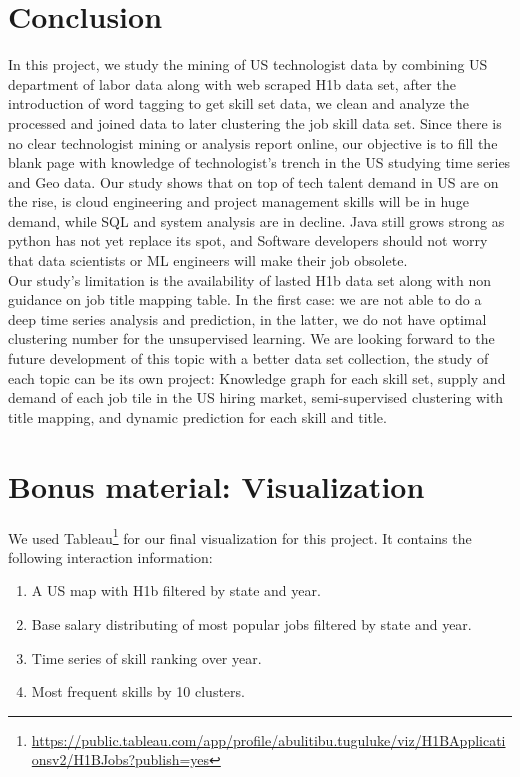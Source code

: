 \section{Conclusion}
In this project, we study the mining of US technologist data by combining US department of labor data along with web scraped H1b data set, after the introduction of word tagging to get skill set data, we clean and analyze the processed and joined data to later clustering the job skill data set. Since there is no clear technologist mining or analysis report online, our objective is to fill the blank page with knowledge of technologist's trench in the US studying  time series and Geo data. Our study shows that on top of tech talent demand in US are on the rise, is cloud engineering and project management skills will be in huge demand, while SQL and system analysis are in decline. Java still grows strong as python has not yet replace its spot, and Software developers should not worry that data scientists or ML engineers will make their job obsolete. \\
Our study's limitation is the availability of  lasted H1b data set along with non guidance on job title mapping table. In the first case: we are not able to do a deep time series analysis and prediction, in the latter, we do not have optimal clustering number for the unsupervised learning. 
We are looking forward to the future development of this topic with a better data set collection, the study of each topic can be its own project: Knowledge graph for each skill set, supply and demand of each job tile in the US hiring market, semi-supervised clustering with title mapping, and dynamic prediction for each skill and title.
\newpage 
\section*{Bonus material: Visualization}
We used Tableau\footnote{\url{https://public.tableau.com/app/profile/abulitibu.tuguluke/viz/H1BApplicationsv2/H1BJobs?publish=yes}} for our final visualization for this project. It contains  the following interaction information:\begin{enumerate}
\item A US map with H1b filtered by state and year.
\item Base salary distributing of most popular jobs filtered by state and year. 
\item Time series of skill ranking over year.
\item Most frequent skills by 10 clusters.  
\end{enumerate}







